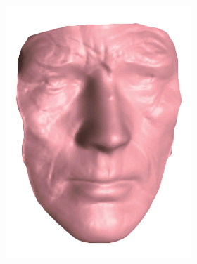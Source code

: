 \begin{figure}
\begin{subfigure}{0.23\textwidth}
        \includegraphics[width=\textwidth]{statistical_normals/images/kemelmacher_borrowed/beckett_depth}
\label{fig:samuel-beckett-kemelmacher}
    \end{subfigure}
    \\
    \begin{subfigure}{0.23\textwidth}
        \centering

\end{subfigure}
\end{figure}
